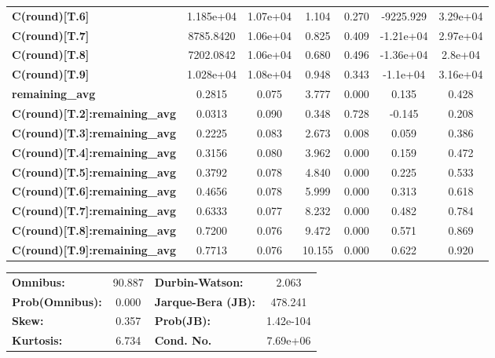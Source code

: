 \begin{center}
\begin{tabular}{lcccccc}
\textbf{C(round)[T.6]}                &    1.185e+04  &     1.07e+04     &     1.104  &         0.270        &    -9225.929    &     3.29e+04     \\
\textbf{C(round)[T.7]}                &    8785.8420  &     1.06e+04     &     0.825  &         0.409        &    -1.21e+04    &     2.97e+04     \\
\textbf{C(round)[T.8]}                &    7202.0842  &     1.06e+04     &     0.680  &         0.496        &    -1.36e+04    &      2.8e+04     \\
\textbf{C(round)[T.9]}                &    1.028e+04  &     1.08e+04     &     0.948  &         0.343        &     -1.1e+04    &     3.16e+04     \\
\textbf{remaining\_avg}               &       0.2815  &        0.075     &     3.777  &         0.000        &        0.135    &        0.428     \\
\textbf{C(round)[T.2]:remaining\_avg} &       0.0313  &        0.090     &     0.348  &         0.728        &       -0.145    &        0.208     \\
\textbf{C(round)[T.3]:remaining\_avg} &       0.2225  &        0.083     &     2.673  &         0.008        &        0.059    &        0.386     \\
\textbf{C(round)[T.4]:remaining\_avg} &       0.3156  &        0.080     &     3.962  &         0.000        &        0.159    &        0.472     \\
\textbf{C(round)[T.5]:remaining\_avg} &       0.3792  &        0.078     &     4.840  &         0.000        &        0.225    &        0.533     \\
\textbf{C(round)[T.6]:remaining\_avg} &       0.4656  &        0.078     &     5.999  &         0.000        &        0.313    &        0.618     \\
\textbf{C(round)[T.7]:remaining\_avg} &       0.6333  &        0.077     &     8.232  &         0.000        &        0.482    &        0.784     \\
\textbf{C(round)[T.8]:remaining\_avg} &       0.7200  &        0.076     &     9.472  &         0.000        &        0.571    &        0.869     \\
\textbf{C(round)[T.9]:remaining\_avg} &       0.7713  &        0.076     &    10.155  &         0.000        &        0.622    &        0.920     \\
\bottomrule
\end{tabular}
\begin{tabular}{lclc}
\textbf{Omnibus:}       & 90.887 & \textbf{  Durbin-Watson:     } &     2.063  \\
\textbf{Prob(Omnibus):} &  0.000 & \textbf{  Jarque-Bera (JB):  } &   478.241  \\
\textbf{Skew:}          &  0.357 & \textbf{  Prob(JB):          } & 1.42e-104  \\
\textbf{Kurtosis:}      &  6.734 & \textbf{  Cond. No.          } &  7.69e+06  \\
\bottomrule
\end{tabular}
\end{center}

